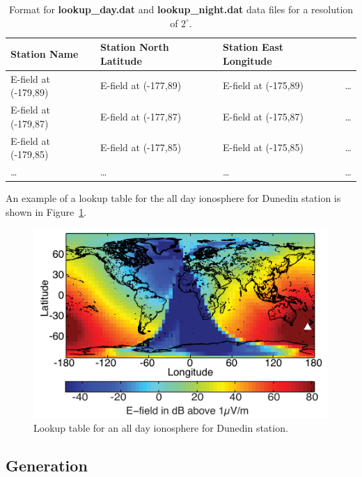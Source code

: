 \begin{table}[h!]
\begin{center}
\begin{tabular}{|p{1.5in}|p{1.75in}|p{1.75in}|p{1in}|}
\hline
\rule{0pt}{3ex}
Station Name	&Station North Latitude	&	Station East Longitude & \\ 
\hline
\rule{0pt}{3ex}
E-field at (-179,89)	& E-field at (-177,89) &	E-field at (-175,89) & \dots \\ 
\hline
\rule{0pt}{3ex}
E-field at (-179,87)	& E-field at (-177,87) &	E-field at (-175,87) & \dots \\ 
\hline
\rule{0pt}{3ex}
E-field at (-179,85)	& E-field at (-177,85) &	E-field at (-175,85) & \dots \\ 
\hline
\rule{0pt}{3ex}
\dots	& \dots &	\dots & \dots \\ 
\hline
\end{tabular}
\end{center}
\caption{Format for \textbf{lookup\_day.dat} and \textbf{lookup\_night.dat} data files for a resolution of $2^\circ$.}
\label{bootstrap:table:lookup}
\end{table}

An example of a lookup table for the all day ionosphere for Dunedin station is shown in Figure~\ref{bootstrap:fig:lookup}.

\begin{figure}[ht!]
   \centering
   \includegraphics[scale=1]{Energy/Figures/PPS_Lookup.pdf} 
   \caption{Lookup table for an all day ionosphere for Dunedin station.}
   \label{bootstrap:fig:lookup}
\end{figure}

\subsection{Generation}

